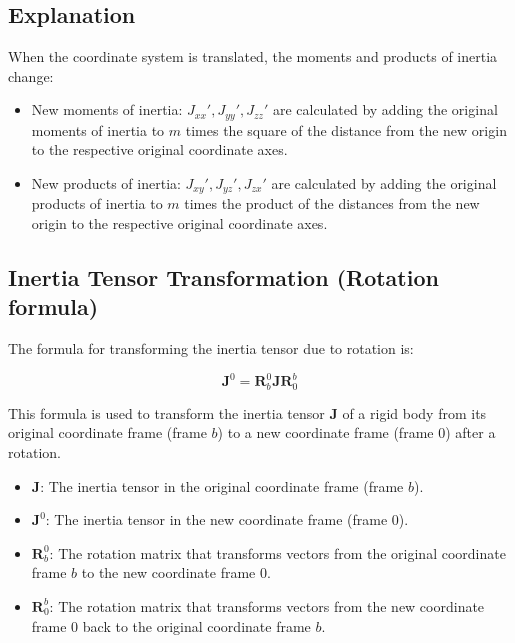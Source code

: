 \subsection{Explanation}
When the coordinate system is translated, the moments and products of inertia change:
\begin{itemize}
    \item New moments of inertia: \( J_{xx}', J_{yy}', J_{zz}' \) are calculated by adding the original moments of inertia to \( m \) times the square of the distance from the new origin to the respective original coordinate axes.
    \item New products of inertia: \( J_{xy}', J_{yz}', J_{zx}' \) are calculated by adding the original products of inertia to \( m \) times the product of the distances from the new origin to the respective original coordinate axes.
\end{itemize}

\subsection{Inertia Tensor Transformation (Rotation formula)}

The formula for transforming the inertia tensor due to rotation is:

\[ \mathbf{J}^0 = \mathbf{R}^0_b \mathbf{J} \mathbf{R}^b_0 \]

This formula is used to transform the inertia tensor \(\mathbf{J}\) of a rigid body from its original coordinate frame (frame \(b\)) to a new coordinate frame (frame \(0\)) after a rotation.

\begin{itemize}
    \item \(\mathbf{J}\): The inertia tensor in the original coordinate frame (frame \(b\)).
    \item \(\mathbf{J}^0\): The inertia tensor in the new coordinate frame (frame \(0\)).
    \item \(\mathbf{R}^0_b\): The rotation matrix that transforms vectors from the original coordinate frame \(b\) to the new coordinate frame \(0\).
    \item \(\mathbf{R}^b_0\): The rotation matrix that transforms vectors from the new coordinate frame \(0\) back to the original coordinate frame \(b\). 
\end{itemize}



